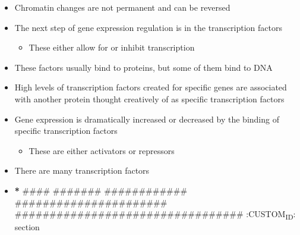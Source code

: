 \documentclass[letterpaper]{article}
\begin{document}
\begin{itemize}
\item Chromatin changes are not permanent and can be reversed

\item The next step of gene expression regulation is in the transcription
factors

\begin{itemize}
\item These either allow for or inhibit transcription
\end{itemize}

\item These factors usually bind to proteins, but some of them bind to DNA

\item High levels of transcription factors created for specific genes are
associated with another protein thought creatively of as specific
transcription factors

\item Gene expression is dramatically increased or decreased by the binding
of specific transcription factors

\begin{itemize}
\item These are either activators or repressors
\end{itemize}

\item There are many transcription factors

\item \textbf{*} \#\#\#\# \#\#\#\#\#\#\# \#\#\#\#\#\#\#\#\#\#\#\# \#\#\#\#\#\#\#\#\#\#\#\#\#\#\#\#\#\#\#\#\#\#
\#\#\#\#\#\#\#\#\#\#\#\#\#\#\#\#\#\#\#\#\#\#\#\#\#\#\#\#\#\#\#\#\#
:CUSTOM\textsubscript{ID}: section
\end{itemize}
\end{document}
